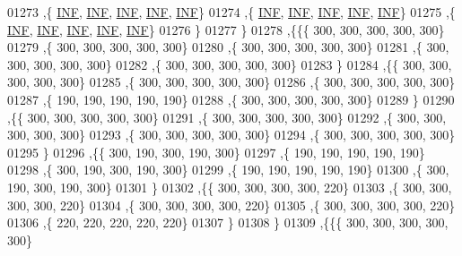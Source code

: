\begin{DoxyCode}
01273    ,\{   \mbox{\hyperlink{1_88_84__epars_8h_a12c2040f25d8e3a7b9e1c2024c618cb6}{INF}},   \mbox{\hyperlink{1_88_84__epars_8h_a12c2040f25d8e3a7b9e1c2024c618cb6}{INF}},   \mbox{\hyperlink{1_88_84__epars_8h_a12c2040f25d8e3a7b9e1c2024c618cb6}{INF}},   \mbox{\hyperlink{1_88_84__epars_8h_a12c2040f25d8e3a7b9e1c2024c618cb6}{INF}},   \mbox{\hyperlink{1_88_84__epars_8h_a12c2040f25d8e3a7b9e1c2024c618cb6}{INF}}\}
01274    ,\{   \mbox{\hyperlink{1_88_84__epars_8h_a12c2040f25d8e3a7b9e1c2024c618cb6}{INF}},   \mbox{\hyperlink{1_88_84__epars_8h_a12c2040f25d8e3a7b9e1c2024c618cb6}{INF}},   \mbox{\hyperlink{1_88_84__epars_8h_a12c2040f25d8e3a7b9e1c2024c618cb6}{INF}},   \mbox{\hyperlink{1_88_84__epars_8h_a12c2040f25d8e3a7b9e1c2024c618cb6}{INF}},   \mbox{\hyperlink{1_88_84__epars_8h_a12c2040f25d8e3a7b9e1c2024c618cb6}{INF}}\}
01275    ,\{   \mbox{\hyperlink{1_88_84__epars_8h_a12c2040f25d8e3a7b9e1c2024c618cb6}{INF}},   \mbox{\hyperlink{1_88_84__epars_8h_a12c2040f25d8e3a7b9e1c2024c618cb6}{INF}},   \mbox{\hyperlink{1_88_84__epars_8h_a12c2040f25d8e3a7b9e1c2024c618cb6}{INF}},   \mbox{\hyperlink{1_88_84__epars_8h_a12c2040f25d8e3a7b9e1c2024c618cb6}{INF}},   \mbox{\hyperlink{1_88_84__epars_8h_a12c2040f25d8e3a7b9e1c2024c618cb6}{INF}}\}
01276    \}
01277   \}
01278  ,\{\{\{   300,   300,   300,   300,   300\}
01279    ,\{   300,   300,   300,   300,   300\}
01280    ,\{   300,   300,   300,   300,   300\}
01281    ,\{   300,   300,   300,   300,   300\}
01282    ,\{   300,   300,   300,   300,   300\}
01283    \}
01284   ,\{\{   300,   300,   300,   300,   300\}
01285    ,\{   300,   300,   300,   300,   300\}
01286    ,\{   300,   300,   300,   300,   300\}
01287    ,\{   190,   190,   190,   190,   190\}
01288    ,\{   300,   300,   300,   300,   300\}
01289    \}
01290   ,\{\{   300,   300,   300,   300,   300\}
01291    ,\{   300,   300,   300,   300,   300\}
01292    ,\{   300,   300,   300,   300,   300\}
01293    ,\{   300,   300,   300,   300,   300\}
01294    ,\{   300,   300,   300,   300,   300\}
01295    \}
01296   ,\{\{   300,   190,   300,   190,   300\}
01297    ,\{   190,   190,   190,   190,   190\}
01298    ,\{   300,   190,   300,   190,   300\}
01299    ,\{   190,   190,   190,   190,   190\}
01300    ,\{   300,   190,   300,   190,   300\}
01301    \}
01302   ,\{\{   300,   300,   300,   300,   220\}
01303    ,\{   300,   300,   300,   300,   220\}
01304    ,\{   300,   300,   300,   300,   220\}
01305    ,\{   300,   300,   300,   300,   220\}
01306    ,\{   220,   220,   220,   220,   220\}
01307    \}
01308   \}
01309  ,\{\{\{   300,   300,   300,   300,   300\}

\end{DoxyCode}

